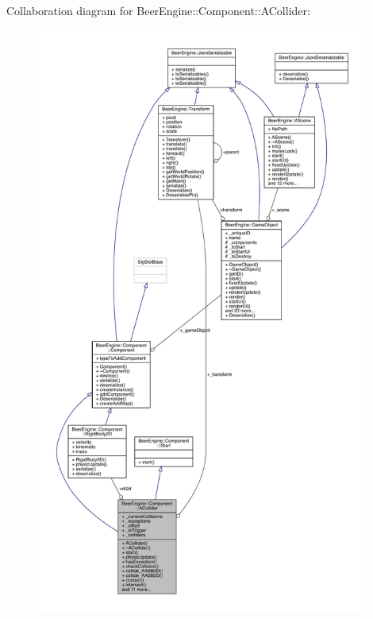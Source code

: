 Collaboration diagram for Beer\+Engine\+:\+:Component\+:\+:A\+Collider\+:\nopagebreak
\begin{figure}[H]
\begin{center}
\leavevmode
\includegraphics[height=550pt]{class_beer_engine_1_1_component_1_1_a_collider__coll__graph}
\end{center}
\end{figure}
